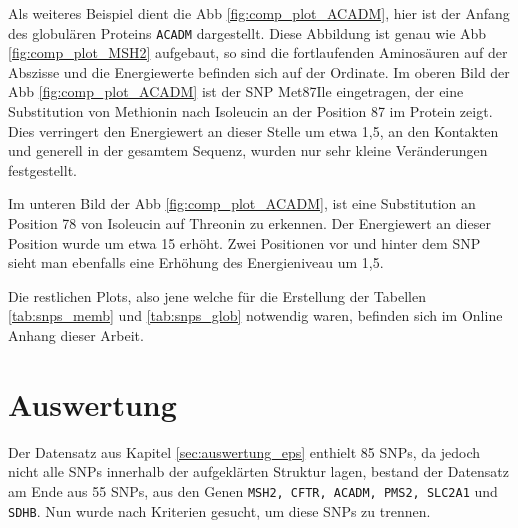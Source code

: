 Als weiteres Beispiel dient die \ac{Abb} \ref{fig:comp_plot_ACADM}, hier ist der Anfang des globulären Proteins \texttt{ACADM} dargestellt. Diese Abbildung ist genau wie \ac{Abb} \ref{fig:comp_plot_MSH2} aufgebaut, so sind die fortlaufenden Aminosäuren auf der Abszisse und die Energiewerte befinden sich auf der Ordinate. Im oberen Bild der \ac{Abb} \ref{fig:comp_plot_ACADM} ist der \ac{SNP} Met87Ile eingetragen, der eine Substitution von Methionin nach Isoleucin an der Position 87 im Protein zeigt. Dies verringert den Energiewert an dieser Stelle um etwa 1,5, an den Kontakten und generell in der gesamtem Sequenz, wurden nur sehr kleine Veränderungen festgestellt.

Im unteren Bild der \ac{Abb} \ref{fig:comp_plot_ACADM}, ist eine Substitution an Position 78 von Isoleucin auf Threonin zu erkennen. Der Energiewert an dieser Position wurde um etwa 15 erhöht. Zwei Positionen vor und hinter dem \ac{SNP} sieht man ebenfalls eine Erhöhung des Energieniveau um 1,5.

Die restlichen Plots, also jene welche für die Erstellung der Tabellen \ref{tab:snps_memb} und \ref{tab:snps_glob} notwendig waren, befinden sich im Online Anhang dieser Arbeit.



\newpage
\section{Auswertung}
\label{sec:snp_auswertung}
Der Datensatz aus Kapitel \ref{sec:auswertung_eps} enthielt 85 \ac{SNP}s, da jedoch nicht alle SNPs innerhalb der aufgeklärten Struktur lagen, bestand der Datensatz am Ende aus 55 \ac{SNP}s, aus den Genen \texttt{MSH2, CFTR, ACADM, PMS2, SLC2A1} und \texttt{SDHB}. Nun wurde nach Kriterien gesucht, um diese SNPs zu trennen. 

